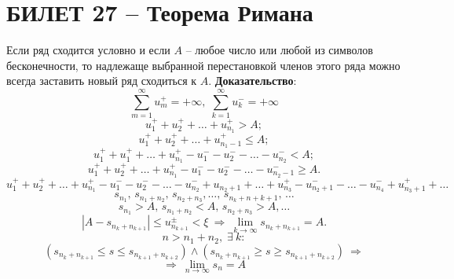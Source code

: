 \documentclass{article}
\begin{document}
\section{БИЛЕТ 27 -- Теорема Римана}
Если ряд сходится условно и если $A$ – любое число или любой из символов бесконечности, то надлежаще выбранной перестановкой членов этого ряда можно всегда заставить новый ряд сходиться к $A$.
\newline
\newline
\textbf{Доказательство}:
$$ \sum_{m=1}^{\infty}u_{m}^{+}=+\infty,\;\sum_{k=1}^{\infty}u_{k}^{-}=+\infty $$
$$ u_{1}^{+}+u_{2}^{+}+\ldots+u_{n_{1}}^{+}>A; $$
$$ u_{1}^{+}+u_{2}^{+}+\ldots+u_{n_{1}-1}^{+}\leqslant A; $$
$$ u_{1}^{+}+u_{1}^{+}+\ldots+u_{n_{1}}^{+}-u_{1}^{-}-u_{2}^{-}-\ldots-u_{n_{2}}^{-}<A; $$
$$ u_{1}^{+}+u_{2}^{+}+\ldots+u_{n_{1}}^{+}-u_{1}^{-}-u_{2}^{-}-\ldots-u_{n_{2}-1}^{-}\geqslant A. $$
$$  $$
$$ u_{1}^{+}+u_{2}^{+}+\ldots+u_{n_{1}}^{+}-u_{1}^{-}-u_{2}^{-}-\ldots-u_{n_{2}}^{-}+u_{n_{2}+1}+\ldots+u_{n_{3}}^{+}-u_{n_{2}+1}^{-}-\ldots-u_{n_{4}}^{-}+u_{n_{3}+1}^{+}+\ldots $$
$$ s_{n_{1}},\,s_{n_{1}+n_{2}},\,s_{n_{2}+n_{3}},\ldots,\,s_{n_{k}+n+{k+1}},\,\ldots $$
$$ s_{n_{1}}>A,\,s_{n_{1}+n_{2}}<A,\,s_{n_{2}+n_{3}}>A,\ldots $$
$$ |A-s_{n_{k}+n_{k+1}}|\leqslant u_{n_{k+1}}^{\pm}<\xi\:\Rightarrow\:\lim_{k\to\infty}s_{n_{k}+n_{k+1}}=A. $$
$$ n>n_{1}+n_{2},\; \exists\:k: $$
$$ (s_{n_{k}+n_{k+1}}\leqslant s\leqslant s_{n_{k+1}+n_{k+2}}) \land (s_{n_{k}+n_{k+1}}\geqslant s\geqslant s_{n_{k+1}+n_{k+2}}) \:\Rightarrow $$
$$\Rightarrow\:\lim_{n\to\infty} s_{n}=A$$
\end{document}
